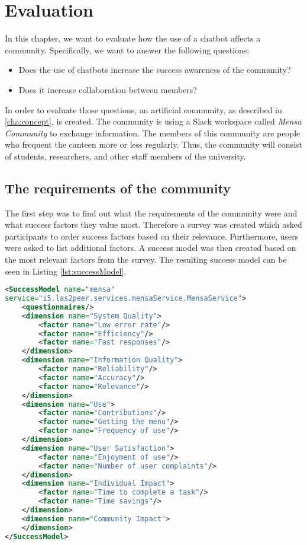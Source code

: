 \chapter{Evaluation}\label{cha:eval}
In this chapter, we want to evaluate how the use of a chatbot affects a community.
Specifically, we want to answer the following questions:
\begin{itemize}
    \item Does the use of chatbots increase the success awareness of the community?
    \item Does it increase collaboration between members?
\end{itemize}

In order to evaluate those questions, an artificial community, as described in \ref{cha:concept}, is created.  
The community is using a Slack workspace called \emph{Mensa Community} to exchange information.
The members of this community are people who frequent the canteen more or less regularly.
Thus, the community will consist of students, researchers, and other staff members of the university.

\section{The requirements of the community}
The first step was to find out what the requirements of the community were and what success factors they value most.
Therefore a survey was created which asked participants to order success factors based on their relevance. 
Furthermore, users were asked to list additional factors.
A success model was then created based on the most relevant factors from the survey. The resulting success model can be seen in Listing \ref{lst:successModel}.

\begin{lstlisting}[language=XML,caption=Success Model based on requirements, label=lst:successModel]
<SuccessModel name="mensa" 
service="i5.las2peer.services.mensaService.MensaService">
    <questionnaires/>
    <dimension name="System Quality">
        <factor name="Low error rate"/>
        <factor name="Efficiency"/>
        <factor name="Fast responses"/>
    </dimension>
    <dimension name="Information Quality">
        <factor name="Reliability"/>
        <factor name="Accuracy"/>
        <factor name="Relevance"/>
    </dimension>
    <dimension name="Use">
        <factor name="Contributions"/>
        <factor name="Getting the menu"/>
        <factor name="Frequency of use"/>
    </dimension>
    <dimension name="User Satisfaction">
        <factor name="Enjoyment of use"/>
        <factor name="Number of user complaints"/>
    </dimension>
    <dimension name="Individual Impact">
        <factor name="Time to complete a task"/>
        <factor name="Time savings"/>
    </dimension>
    <dimension name="Community Impact">
    </dimension>
</SuccessModel>
\end{lstlisting}

